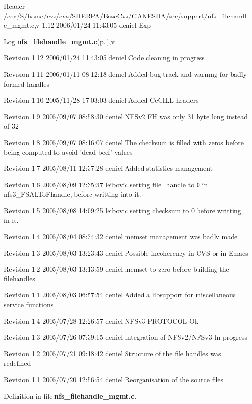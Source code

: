 \begin{Desc}
\item[Header]/cea/S/home/cvs/cvs/SHERPA/Base\-Cvs/GANESHA/src/support/nfs\_\-filehandle\_\-mgmt.c,v 1.12 2006/01/24 11:43:05 deniel Exp \end{Desc}


\begin{Desc}
\item[Log]{\bf nfs\_\-filehandle\_\-mgmt.c}{\rm (p.\,\pageref{nfs__filehandle__mgmt_8c})},v \end{Desc}
Revision 1.12 2006/01/24 11:43:05 deniel Code cleaning in progress

Revision 1.11 2006/01/11 08:12:18 deniel Added bug track and warning for badly formed handles

Revision 1.10 2005/11/28 17:03:03 deniel Added Ce\-CILL headers

Revision 1.9 2005/09/07 08:58:30 deniel NFSv2 FH was only 31 byte long instead of 32

Revision 1.8 2005/09/07 08:16:07 deniel The checksum is filled with zeros before being computed to avoid 'dead beef' values

Revision 1.7 2005/08/11 12:37:28 deniel Added statistics management

Revision 1.6 2005/08/09 12:35:37 leibovic setting file\_\-handle to 0 in nfs3\_\-FSALTo\-Fhandle, before writting into it.

Revision 1.5 2005/08/08 14:09:25 leibovic setting checksum to 0 before writting in it.

Revision 1.4 2005/08/04 08:34:32 deniel memset management was badly made

Revision 1.3 2005/08/03 13:23:43 deniel Possible incoherency in CVS or in Emacs

Revision 1.2 2005/08/03 13:13:59 deniel memset to zero before building the filehandles

Revision 1.1 2005/08/03 06:57:54 deniel Added a libsupport for miscellaneous service functions

Revision 1.4 2005/07/28 12:26:57 deniel NFSv3 PROTOCOL Ok

Revision 1.3 2005/07/26 07:39:15 deniel Integration of NFSv2/NFSv3 In progress

Revision 1.2 2005/07/21 09:18:42 deniel Structure of the file handles was redefined

Revision 1.1 2005/07/20 12:56:54 deniel Reorganisation of the source files

Definition in file {\bf nfs\_\-filehandle\_\-mgmt.c}.

